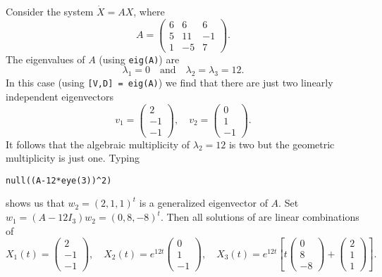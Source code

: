 \documentclass{ximera}
\begin{document}
Consider the system $\dot{X}=AX$, where 
\begin{equation*}    \label{eq:exsyslin2}
A =
\left(\begin{array}{rrr}
     6  &  6  &  6\\
     5  & 11  & -1\\
     1  & -5  &  7
\end{array}\right).
\end{equation*}
The eigenvalues of $A$ (using {\tt eig(A)}) are
\[
\lambda_1=0\quad \mbox{and}\quad \lambda_2=\lambda_3=12.
\]
In this case (using {\tt [V,D] = eig(A)}) we find that there are just two
linearly independent eigenvectors
\[
v_1=\left(\begin{array}{r}
2 \\ -1 \\ -1
\end{array}\right),\quad
v_2=\left(\begin{array}{r}
0 \\ 1 \\ -1
\end{array}\right).
\]
It follows that the algebraic multiplicity
of $\lambda_2=12$
is two but the geometric multiplicity
is just one.  Typing
\begin{verbatim}
null((A-12*eye(3))^2)
\end{verbatim}
shows us that $w_2=(2,1,1)^t$ is a generalized eigenvector of $A$.
Set $w_1=(A-12I_3)w_2=(0,8,-8)^t$.  Then all solutions of 
are linear combinations of
\[
X_1(t)=\left(\begin{array}{r}
2 \\ -1 \\ -1
\end{array}\right), \quad
X_2(t)=e^{12t}\left(\begin{array}{r}
0 \\ 1 \\ -1
\end{array}\right), \quad
X_3(t)=e^{12t}\left[
t\left(\begin{array}{r}
0 \\ 8 \\ -8
\end{array}\right)
+\left(\begin{array}{r}
2 \\ 1 \\ 1
\end{array}\right)\right].
\]
\end{document}
